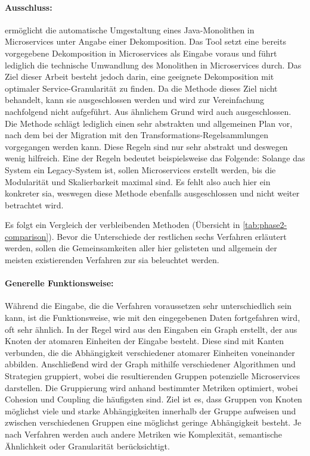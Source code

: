 \paragraph{Ausschluss:}  ermöglicht die automatische Umgestaltung eines Java-Mo\-no\-li\-then in Microservices unter Angabe einer Dekomposition.
Das Tool setzt eine bereits vorgegebene Dekomposition in Microservices als Eingabe voraus und führt lediglich die technische Umwandlung des Monolithen in Microservices durch.
Das Ziel dieser Arbeit besteht jedoch darin, eine geeignete Dekomposition mit optimaler Service-Granularität zu finden.
Da die Methode dieses Ziel nicht behandelt, kann sie ausgeschlossen werden und wird zur Vereinfachung nachfolgend nicht aufgeführt.
Aus ähnlichem Grund wird auch  ausgeschlossen.
Die Methode schlägt lediglich einen sehr abstrakten und allgemeinen Plan vor, nach dem bei der Migration mit den Transformations-Regelsammlungen vorgegangen werden kann.
Diese Regeln sind nur sehr abstrakt und deswegen wenig hilfreich.
Eine der Regeln bedeutet beispielsweise das Folgende:
Solange das System ein Legacy-System ist, sollen Microservices erstellt werden, bis die Modularität und Skalierbarkeit maximal sind.
Es fehlt also auch hier ein konkreter \gls{sia}, weswegen diese Methode ebenfalls ausgeschlossen und nicht weiter betrachtet wird.


Es folgt ein Vergleich der verbleibenden Methoden (Übersicht in \cref{tab:phase2-comparison}).%
%
Bevor die Unterschiede der restlichen sechs Verfahren erläutert werden, sollen die Gemeinsamkeiten aller hier gelisteten und allgemein der meisten existierenden Verfahren zur \gls{sia} beleuchtet werden.
\paragraph{Generelle Funktionsweise:} Während die Eingabe, die die Verfahren voraussetzen sehr un\-ter\-schied\-lich sein kann, ist die Funktionsweise, wie mit den eingegebenen Daten fortgefahren wird, oft sehr ähnlich.
In der Regel wird aus den Eingaben ein Graph erstellt, der aus Knoten der atomaren Einheiten der Eingabe besteht.
Diese sind mit Kanten verbunden, die die Abhängigkeit verschiedener atomarer Einheiten voneinander abbilden.
Anschließend wird der Graph mithilfe verschiedener Algorithmen und Strategien gruppiert, wobei die resultierenden Gruppen potenzielle Microservices darstellen.
Die Gruppierung wird anhand bestimmter Metriken optimiert, wobei Cohesion und Coupling die häufigsten sind.
Ziel ist es, dass Gruppen von Knoten möglichst viele und starke Abhängigkeiten innerhalb der Gruppe aufweisen und zwischen verschiedenen Gruppen eine möglichst geringe Abhängigkeit besteht.
Je nach Verfahren werden auch andere Metriken wie Komplexität, semantische Ähnlichkeit oder Granularität berücksichtigt.

